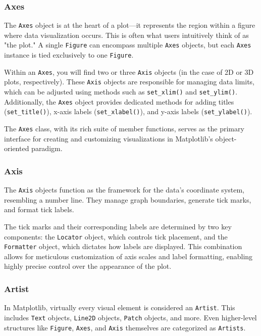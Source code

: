 \subsubsection{Axes}

The \texttt{Axes} object is at the heart of a plot—it represents the region within a figure where data visualization occurs. This is often what users intuitively think of as "the plot." A single \texttt{Figure} can encompass multiple \texttt{Axes} objects, but each \texttt{Axes} instance is tied exclusively to one \texttt{Figure}. 

Within an \texttt{Axes}, you will find two or three \texttt{Axis} objects (in the case of 2D or 3D plots, respectively). These \texttt{Axis} objects are responsible for managing data limits, which can be adjusted using methods such as \texttt{set\_xlim()} and \texttt{set\_ylim()}. Additionally, the \texttt{Axes} object provides dedicated methods for adding titles (\texttt{set\_title()}), x-axis labels (\texttt{set\_xlabel()}), and y-axis labels (\texttt{set\_ylabel()}).

The \texttt{Axes} class, with its rich suite of member functions, serves as the primary interface for creating and customizing visualizations in Matplotlib's object-oriented paradigm.

\subsubsection{Axis}

The \texttt{Axis} objects function as the framework for the data's coordinate system, resembling a number line. They manage graph boundaries, generate tick marks, and format tick labels. 

The tick marks and their corresponding labels are determined by two key components: the \texttt{Locator} object, which controls tick placement, and the \texttt{Formatter} object, which dictates how labels are displayed. This combination allows for meticulous customization of axis scales and label formatting, enabling highly precise control over the appearance of the plot.

\subsubsection{Artist}

In Matplotlib, virtually every visual element is considered an \texttt{Artist}. This includes \texttt{Text} objects, \texttt{Line2D} objects, \texttt{Patch} objects, and more. Even higher-level structures like \texttt{Figure}, \texttt{Axes}, and \texttt{Axis} themselves are categorized as \texttt{Artists}. 

